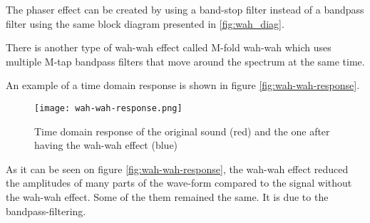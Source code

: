 The phaser effect can be created by using a band-stop filter instead of a bandpass filter using the same block diagram presented in \autoref{fig:wah_diag}.

There is another type of wah-wah effect called M-fold wah-wah which uses multiple M-tap bandpass filters that move around the spectrum at the same time.

An example of a time domain response is shown in figure \autoref{fig:wah-wah-response}.

\begin{figure} [htbp!]
	\centering
	\texttt{[image: wah-wah-response.png]}
	\caption{Time domain response of the original sound (red) and the one after having the wah-wah effect (blue)}
	\label{fig:wah-wah-response}
\end{figure}


As it can be seen on figure \autoref{fig:wah-wah-response}, the wah-wah effect reduced the amplitudes of many parts of the wave-form compared to the signal without the wah-wah effect. Some of the them remained the same. It is due to the bandpass-filtering.
